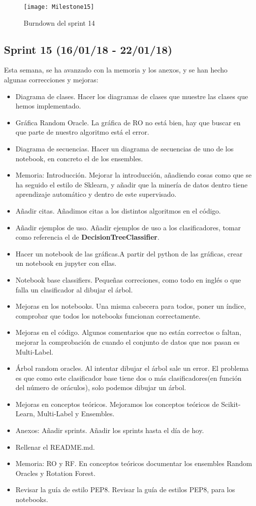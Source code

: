 \begin{figure}
\centering
\texttt{[image: Milestone15]}
\caption{Burndown del sprint 14}
\label{fig:Milestone15}
\end{figure}

\subsection{Sprint 15 (16/01/18 - 22/01/18)}
Esta semana, se ha avanzado con la memoria y los anexos, y se han hecho algunas correcciones y mejoras:
\begin{itemize}
\item Diagrama de clases. Hacer los diagramas de clases que muestre las clases que hemos implementado.
\item Gráfica Random Oracle. La gráfica de RO no está bien, hay que buscar en que parte de nuestro algoritmo está el error.
\item Diagrama de secuencias. Hacer un diagrama de secuencias de uno de los notebook, en concreto el de los ensembles.
\item Memoria: Introducción. Mejorar la introducción, añadiendo cosas como que se ha seguido el estilo de Sklearn, y añadir que la minería de datos dentro tiene aprendizaje automático y dentro de este supervisado.
\item Añadir citas. Añadimos citas a los distintos algoritmos en el código.
\item Añadir ejemplos de uso. Añadir ejemplos de uso a los clasificadores, tomar como referencia el de \textbf{DecisionTreeClassifier}.
\item Hacer un notebook de las gráficas.A partir del python de las gráficas, crear un notebook en jupyter con ellas.
\item Notebook base classifiers. Pequeñas correciones, como todo en inglés o que falla un clasificador al dibujar el árbol.
\item Mejoras en los notebooks. Una misma cabecera para todos, poner un índice, comprobar que todos los notebooks funcionan correctamente.
\item Mejoras en el código. Algunos comentarios que no están correctos o faltan, mejorar la comprobación de cuando el conjunto de datos que nos pasan es Multi-Label. 
\item Árbol random oracles. Al intentar dibujar el árbol sale un error. El problema es que como este clasificador base tiene dos o más clasificadores(en función del número de oráculos), solo podemos dibujar un árbol.
\item Mejoras en conceptos teóricos. Mejoramos los conceptos teóricos de Scikit-Learn, Multi-Label y Ensembles.
\item Anexos: Añadir sprints. Añadir los sprints hasta el día de hoy.
\item Rellenar el README.md. 
\item Memoria: RO y RF. En conceptos teóricos documentar los ensembles Random Oracles y Rotation Forest.
\item Revisar la guía de estilo PEP8. Revisar la guía de estilos PEP8, para los notebooks.

\end{itemize}

